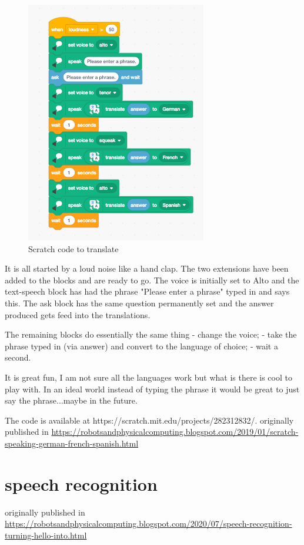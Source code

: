 \begin{figure}
    \centering
    \includegraphics{chapters/chapterCT1/figures/translate8.png}
    \caption{Scratch code to translate}
    \label{fig:scratch_trnslate}
\end{figure}


It is all started by a loud noise like a hand clap. The two extensions have been added to the blocks and are ready to go. The voice is initially set to Alto and the text-speech block has had the phrase "Please enter a phrase" typed in and says this. The ask block has the same question permanently set and the answer produced gets feed into the translations. 

The remaining blocks do essentially the same thing
- change the voice;
- take the phrase typed in (via answer) and convert to the language of choice;
- wait a second.


It is great fun, I am not sure all the languages work but what is there is cool to play with. In an ideal world instead of typing the phrase it would be great to just say the phrase...maybe in the future. 

The code is available at https://scratch.mit.edu/projects/282312832/.
originally published in \url{https://robotsandphysicalcomputing.blogspot.com/2019/01/scratch-speaking-german-french-spanish.html}

\section{speech recognition}
originally published in \url{https://robotsandphysicalcomputing.blogspot.com/2020/07/speech-recognition-turning-hello-into.html}

